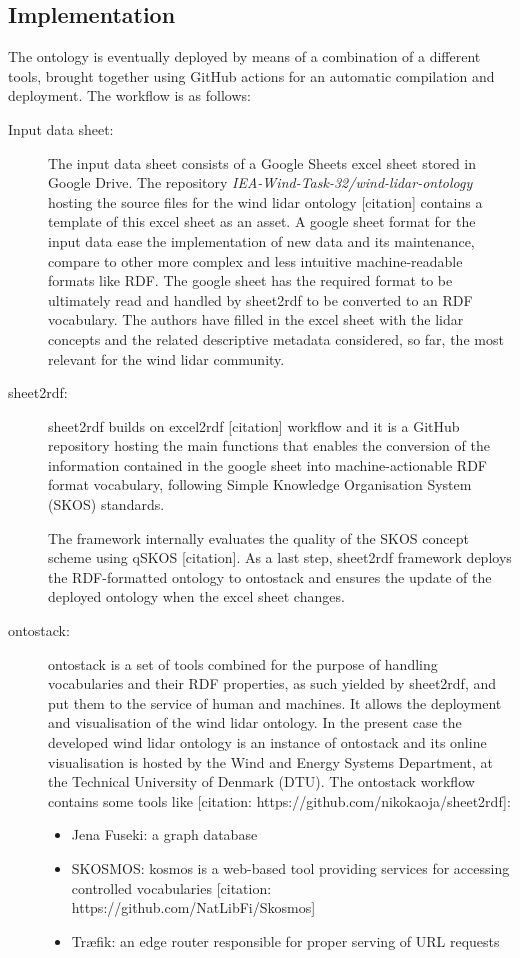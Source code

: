 \documentclass[remotesensing,article,submit,pdftex,moreauthors]{Definitions/mdpi}
\begin{document}
\subsection{Implementation}
The ontology is eventually deployed by means of a combination of a different tools, brought together using GitHub actions for an automatic compilation and deployment. The workflow is as follows: 
\begin{description}
    
    \item [Input data sheet:] The input data sheet consists of a Google Sheets excel sheet stored in Google Drive. The repository  \textit{IEA-Wind-Task-32/wind-lidar-ontology} hosting the source files for the wind lidar ontology [citation] contains a template of this excel sheet as an asset. A google sheet format for the input data ease the implementation of new data and its maintenance, compare to other more complex and less intuitive machine-readable formats like RDF. The google sheet has the required format to be ultimately read and handled by sheet2rdf to be converted to an RDF vocabulary.
    The authors have filled in the excel sheet with the lidar concepts and the related descriptive metadata considered, so far, the most relevant for the wind lidar community. 
    
    \item [sheet2rdf:] sheet2rdf builds on excel2rdf [citation] workflow and it is a GitHub repository hosting the main functions that enables the conversion of the information contained in the google sheet into machine-actionable RDF format vocabulary, following Simple Knowledge Organisation System (SKOS) standards. 
    
    The framework internally evaluates the quality of the SKOS concept scheme using qSKOS [citation]. As a last step, sheet2rdf framework deploys the RDF-formatted ontology to ontostack and ensures the update of the deployed ontology when the excel sheet changes.
    
    \item [ontostack:] ontostack is a set of tools combined for the purpose of handling vocabularies and their RDF properties, as such yielded by sheet2rdf, and put them to the service of human and machines. It allows the deployment and visualisation of the wind lidar ontology. In the present case the developed wind lidar ontology is an instance of ontostack and its online visualisation is hosted by the Wind and Energy Systems Department, at the Technical University  of Denmark (DTU).
    The ontostack workflow contains some tools like [citation: https://github.com/nikokaoja/sheet2rdf]:
    \begin{itemize}
        \item Jena Fuseki: a graph database
        \item SKOSMOS: kosmos is a web-based tool providing services for accessing controlled vocabularies [citation: https://github.com/NatLibFi/Skosmos]
        \item Tr\ae fik: an edge router responsible for proper serving of URL requests
    \end{itemize}
\end{description}
\end{document}

